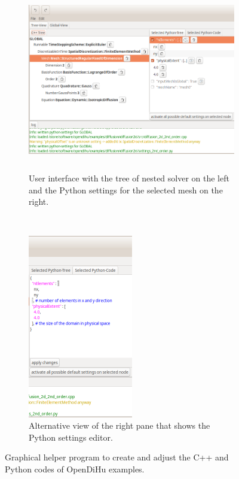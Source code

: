 \begin{figure}%
  \centering%
  \begin{subfigure}[t]{0.71\textwidth}%
    \centering%
    \includegraphics[height=8cm]{images/implementation/gui.png}
    \caption{User interface with the tree of nested solver on the left and the Python settings for the selected mesh on the right.}%
    \label{fig:gui}%
  \end{subfigure}
  \,
  \begin{subfigure}[t]{0.27\textwidth}%
    \centering%
    \includegraphics[height=8cm]{images/implementation/gui3.png}
    \caption{Alternative view of the right pane that shows the Python settings editor.}%
    \label{fig:gui3}%
  \end{subfigure}
  \caption{Graphical helper program to create and adjust the C++ and Python codes of OpenDiHu examples.}%
  \label{fig:gui_a}%
\end{figure}%



